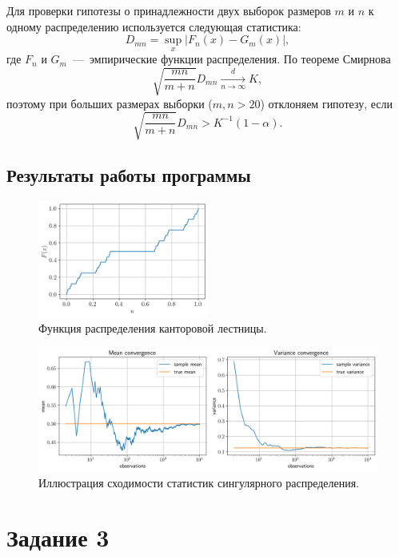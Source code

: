 \documentclass[12pt, a4paper]{article} %
\begin{document}
Для проверки гипотезы о принадлежности двух выборок размеров $m$ и  $n$ к одному распределению используется следующая статистика:
 \[
     D_{mn} = \sup\limits_x \bigl\lvert F_n(x) - G_m(x) \bigr\rvert,
\] 
где $F_n$ и  $G_m$~---~эмпирические функции распределения.
По теореме Смирнова 
 \[
     \sqrt{\frac{mn}{m+n}}D_{mn} \xrightarrow[n\rightarrow \infty]{d} K,
\] 
поэтому при больших размерах выборки ($m, n > 20$) отклоняем гипотезу, если 
\[
    \sqrt{\frac{mn}{m+n}}D_{mn} > K^{-1}(1 - \alpha).
\] 

\subsection{Результаты работы программы}

\begin{figure}[H]
    \centering
    \includegraphics[width=0.5\textwidth]{figures/02_cdf.png}
    \caption{Функция распределения канторовой лестницы.}
    \label{fig:02_cdf}
\end{figure}

\begin{figure}[H]
    \centering
    \includegraphics[width=\textwidth]{figures/02_conv.png}
    \caption{Иллюстрация сходимости статистик сингулярного распределения.}
    \label{fig:02_conv}
\end{figure}


\section{Задание 3}
\end{document}
